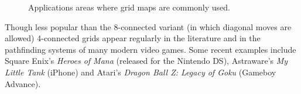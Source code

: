 \begin{figure}[h]
\vspace{1em}
	\centering
\vspace{-0.5em}
{
\small \caption{Applications areas where grid maps are commonly used.}
}
\vspace{1em}
 \end{figure}

Though less popular than the 8-connected variant (in which diagonal moves are
allowed) 4-connected grids appear regularly in the literature \cite{yap02} and in the pathfinding
systems of many modern video games. 
Some recent examples include Square Enix's \emph{Heroes of Mana} (released for the Nintendo DS),
Astraware's \emph{My Little Tank} (iPhone) and Atari's \emph{Dragon Ball Z: Legacy of Goku} 
(Gameboy Advance). 
